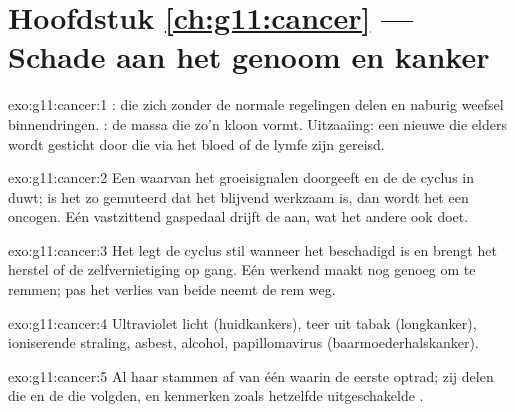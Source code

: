 \section*{Hoofdstuk \ref{ch:g11:cancer} --- Schade aan het genoom en kanker}

\begin{solution}{exo:g11:cancer:1}
:  die zich zonder de normale regelingen delen en naburig
weefsel binnendringen. : de massa die zo'n kloon vormt. Uitzaaiing:
een nieuwe  die elders wordt gesticht door  die via het bloed
of de lymfe zijn gereisd.
\end{solution}

\begin{solution}{exo:g11:cancer:2}
Een  waarvan het  groeisignalen doorgeeft en de  de cyclus in
duwt; is het zo gemuteerd dat het  blijvend werkzaam is, dan wordt
het een oncogen. Eén vastzittend gaspedaal drijft de  aan, wat het
andere  ook doet.
\end{solution}

\begin{solution}{exo:g11:cancer:3}
Het legt de cyclus stil wanneer het  beschadigd is en brengt het
herstel of de zelfvernietiging op gang. Eén werkend  maakt nog genoeg
 om te remmen; pas het verlies van beide neemt de rem weg.
\end{solution}

\begin{solution}{exo:g11:cancer:4}
Ultraviolet licht (huidkankers), teer uit tabak (longkanker), ioniserende
straling, asbest, alcohol, papillomavirus (baarmoederhalskanker).
\end{solution}

\begin{solution}{exo:g11:cancer:5}
Al haar  stammen af van één  waarin de eerste  optrad; zij
delen die  en de  die volgden, en kenmerken zoals hetzelfde
uitgeschakelde .
\end{solution}

